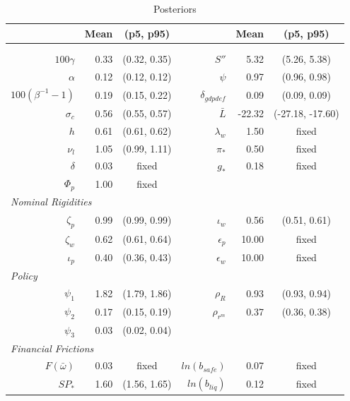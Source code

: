 \documentclass[12pt]{article}
\begin{document}
\pagestyle{empty}
\renewcommand*\footnoterule{}\vspace*{.5cm}
{\small
\begin{longtable}{rrc@{\hspace{1in}}rrc}
\caption{Posteriors}
\label{tab:param-posteriors}
\\ \hline
& Mean & (p5, p95) & & Mean & (p5, p95) \\ \hline
\endhead
\hline \\
\endfoot
\multicolumn{6}{l}{\textit{Steady State}} \\[3pt]
$100\gamma$ & 0.33 & (0.32, 0.35) & $S''$ & 5.32 & (5.26, 5.38) \\
$\alpha$ & 0.12 & (0.12, 0.12) & $\psi$ & 0.97 & (0.96, 0.98) \\
$100(\beta^{-1} - 1)$ & 0.19 & (0.15, 0.22) & $\delta_{gdpdef}$ & 0.09 & (0.09, 0.09) \\
$\sigma_{c}$ & 0.56 & (0.55, 0.57) & $\bar{L}$ & -22.32 & (-27.18, -17.60) \\
$h$ & 0.61 & (0.61, 0.62) & $\lambda_w$ & 1.50 & \scriptsize{fixed} \\
$\nu_l$ & 1.05 & (0.99, 1.11) & $\pi_*$ & 0.50 & \scriptsize{fixed} \\
$\delta$ & 0.03 & \scriptsize{fixed} & $g_*$ & 0.18 & \scriptsize{fixed} \\
$\Phi_p$ & 1.00 & \scriptsize{fixed} & & & \\[3pt]
\multicolumn{6}{l}{\textit{Nominal Rigidities}} \\[3pt]
$\zeta_p$ & 0.99 & (0.99, 0.99) & $\iota_w$ & 0.56 & (0.51, 0.61) \\
$\zeta_w$ & 0.62 & (0.61, 0.64) & $\epsilon_{p}$ & 10.00 & \scriptsize{fixed} \\
$\iota_p$ & 0.40 & (0.36, 0.43) & $\epsilon_{w}$ & 10.00 & \scriptsize{fixed} \\[3pt]
\multicolumn{6}{l}{\textit{Policy}} \\[3pt]
$\psi_1$ & 1.82 & (1.79, 1.86) & $\rho_R$ & 0.93 & (0.93, 0.94) \\
$\psi_2$ & 0.17 & (0.15, 0.19) & $\rho_{r^m}$ & 0.37 & (0.36, 0.38) \\
$\psi_3$ & 0.03 & (0.02, 0.04) & & & \\[3pt]
\multicolumn{6}{l}{\textit{Financial Frictions}} \\[3pt]
$F(\bar{\omega})$ & 0.03 & \scriptsize{fixed} & $ln(b_{safe})$ & 0.07 & \scriptsize{fixed} \\
$SP_*$ & 1.60 & (1.56, 1.65) & $ln(b_{liq})$ & 0.12 & \scriptsize{fixed} \\

\end{longtable}}
\end{document}
